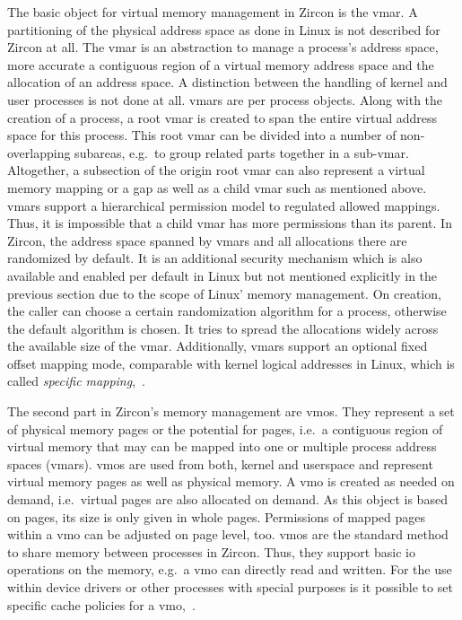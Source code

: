 The basic object for virtual memory management in Zircon is the \acl{vmar}.
A partitioning of the physical address space as done in Linux is not described for Zircon at all.
The \ac{vmar} is an abstraction to manage a process's address space, more accurate a contiguous region of a virtual memory address space and the allocation of an address space.
A distinction between the handling of kernel and user processes is not done at all.
\acp{vmar} are per process objects.
Along with the creation of a process, a root \ac{vmar} is created to span the entire virtual address space for this process.
This root \ac{vmar} can be divided into a number of non-overlapping subareas, e.g.\ to group related parts together in a sub-\ac{vmar}.
Altogether, a subsection of the origin root \ac{vmar} can also represent a virtual memory mapping or a gap as well as a child \ac{vmar} such as mentioned above.
\acp{vmar} support a hierarchical permission model to regulated allowed mappings.
Thus, it is impossible that a child \ac{vmar} has more permissions than its parent.
In Zircon, the address space spanned by \acp{vmar} and all allocations there are randomized by default.
It is an additional security mechanism which is also available and enabled per default in Linux but not mentioned explicitly in the previous section due to the scope of Linux' memory management.
On creation, the caller can choose a certain randomization algorithm for a process, otherwise the default algorithm is chosen.
It tries to spread the allocations widely across the available size of the \ac{vmar}.
Additionally, \acp{vmar} support an optional fixed offset mapping mode, comparable with kernel logical addresses in Linux, which is called \textit{specific mapping}\cite{zircon-concepts},~\cite{zircon-vmar}.

The second part in Zircon's memory management are \acfp{vmo}.
They represent a set of physical memory pages or the potential for pages, i.e.\ a contiguous region of virtual memory that may can be mapped into one or multiple process address spaces (\acp{vmar}).
\acp{vmo} are used from both, kernel and userspace and represent virtual memory pages as well as physical memory.
A \ac{vmo} is created as needed on demand, i.e.\ virtual pages are also allocated on demand.
As this object is based on pages, its size is only given in whole pages.
Permissions of mapped pages within a \ac{vmo} can be adjusted on page level, too.
\acp{vmo} are the standard method to share memory between processes in Zircon.
Thus, they support basic \ac{io} operations on the memory, e.g.\ a \ac{vmo} can directly read and written.
For the use within device drivers or other processes with special purposes is it possible to set specific cache policies for a \ac{vmo}\cite{zircon-concepts},~\cite{zircon-vmo}.



